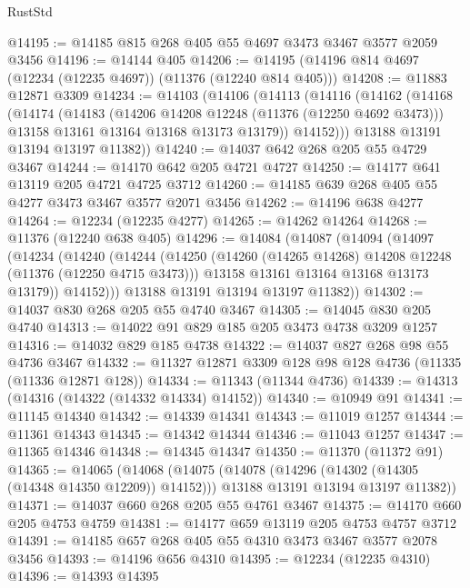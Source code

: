\begin{lexlean}{RustStd}
\begin{coremodule}
{{{{{{{{{{{{{{{{{{{@14195 := @14185 @815 @268 @405 @55 @4697 @3473 @3467 @3577 @2059 @3456
@14196 := @14144 @405
@14206 := @14195 (@14196 @814 @4697 (@12234 (@12235 @4697)) (@11376 (@12240 @814 @405)))
@14208 := @11883 @12871 @3309
@14234 := @14103
    (@14106
      (@14113
        (@14116
          (@14162
            (@14168
              (@14174
                (@14183
                  (@14206 @14208 @12248 (@11376 (@12250 @4692 @3473)))
                  @13158
                  @13161
                  @13164
                  @13168
                  @13173
                  @13179))
              @14152)))
        @13188
        @13191
        @13194
        @13197
        @11382))
@14240 := @14037 @642 @268 @205 @55 @4729 @3467
@14244 := @14170 @642 @205 @4721 @4727
@14250 := @14177 @641 @13119 @205 @4721 @4725 @3712
@14260 := @14185 @639 @268 @405 @55 @4277 @3473 @3467 @3577 @2071 @3456
@14262 := @14196 @638 @4277
@14264 := @12234 (@12235 @4277)
@14265 := @14262 @14264
@14268 := @11376 (@12240 @638 @405)
@14296 := @14084
    (@14087
      (@14094
        (@14097
          (@14234
            (@14240
              (@14244
                (@14250
                  (@14260 (@14265 @14268) @14208 @12248 (@11376 (@12250 @4715 @3473)))
                  @13158
                  @13161
                  @13164
                  @13168
                  @13173
                  @13179))
              @14152)))
        @13188
        @13191
        @13194
        @13197
        @11382))
@14302 := @14037 @830 @268 @205 @55 @4740 @3467
@14305 := @14045 @830 @205 @4740
@14313 := @14022 @91 @829 @185 @205 @3473 @4738 @3209 @1257
@14316 := @14032 @829 @185 @4738
@14322 := @14037 @827 @268 @98 @55 @4736 @3467
@14332 := @11327 @12871 @3309 @128 @98 @128 @4736 (@11335 (@11336 @12871 @128))
@14334 := @11343 (@11344 @4736)
@14339 := @14313 (@14316 (@14322 (@14332 @14334) @14152))
@14340 := @10949 @91
@14341 := @11145 @14340
@14342 := @14339 @14341
@14343 := @11019 @1257
@14344 := @11361 @14343
@14345 := @14342 @14344
@14346 := @11043 @1257
@14347 := @11365 @14346
@14348 := @14345 @14347
@14350 := @11370 (@11372 @91)
@14365 := @14065
    (@14068
      (@14075
        (@14078 (@14296 (@14302 (@14305 (@14348 @14350 @12209)) @14152)))
        @13188
        @13191
        @13194
        @13197
        @11382))
@14371 := @14037 @660 @268 @205 @55 @4761 @3467
@14375 := @14170 @660 @205 @4753 @4759
@14381 := @14177 @659 @13119 @205 @4753 @4757 @3712
@14391 := @14185 @657 @268 @405 @55 @4310 @3473 @3467 @3577 @2078 @3456
@14393 := @14196 @656 @4310
@14395 := @12234 (@12235 @4310)
@14396 := @14393 @14395
}}}}}}}}}}}}}}}}}}}
\end{coremodule}
\end{lexlean}
